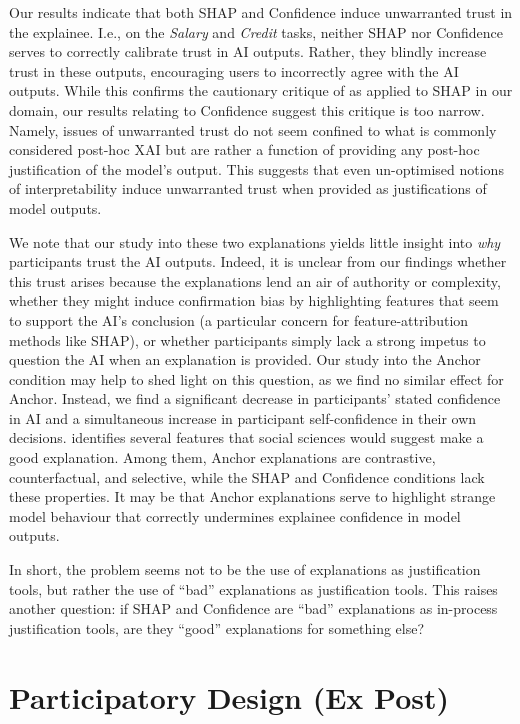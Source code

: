 Our results indicate that both SHAP and Confidence induce unwarranted trust in the explainee. I.e., on the \emph{Salary} and \emph{Credit} tasks, neither SHAP nor Confidence serves to correctly calibrate trust in AI outputs. Rather, they blindly increase trust in these outputs, encouraging users to incorrectly agree with the AI outputs. While this confirms the cautionary critique of \textcite{Lipton} as applied to SHAP in our domain, our results relating to Confidence suggest this critique is too narrow. Namely, issues of unwarranted trust do not seem confined to what is commonly considered post-hoc XAI but are rather a function of providing any post-hoc justification of the model's output. This suggests that even un-optimised notions of interpretability induce unwarranted trust when provided as justifications of model outputs.

We note that our study into these two explanations yields little insight into \emph{why} participants trust the AI outputs. Indeed, it is unclear from our findings whether this trust arises because the explanations lend an air of authority or complexity, whether they might induce confirmation bias by highlighting features that seem to support the AI's conclusion (a particular concern for feature-attribution methods like SHAP), or whether participants simply lack a strong impetus to question the AI when an explanation is provided. Our study into the Anchor condition may help to shed light on this question, as we find no similar effect for Anchor. Instead, we find a significant decrease in participants' stated confidence in AI and a simultaneous increase in participant self-confidence in their own decisions. \textcite{miller_explanation_2017} identifies several features that social sciences would suggest make a good explanation. Among them, Anchor explanations are contrastive, counterfactual, and selective, while the SHAP and Confidence conditions lack these properties. It may be that Anchor explanations serve to highlight strange model behaviour that correctly undermines explainee confidence in model outputs. 

In short, the problem seems not to be the use of explanations as justification tools, but rather the use of ``bad'' explanations as justification tools. This raises another question: if SHAP and Confidence are ``bad'' explanations as in-process justification tools, are they ``good'' explanations for something else?

\section[Participatory Design]{Participatory Design (Ex Post)}\label{sec:xaicase}
